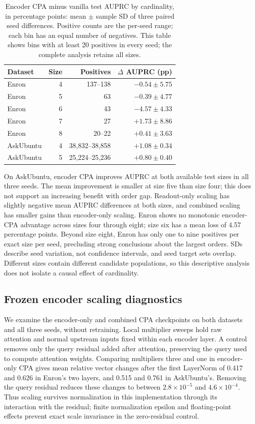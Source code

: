 \documentclass{article}
\begin{document}
\begin{table}[t]
\centering
\small
\caption{Encoder CPA minus vanilla test AUPRC by cardinality, in percentage points: mean $\pm$ sample SD of three paired seed differences. Positive counts are the per-seed range; each bin has an equal number of negatives. This table shows bins with at least 20 positives in every seed; the complete analysis retains all sizes.}
\label{tab:cardinality}
\begin{tabular}{lrrr}
\toprule
Dataset & Size & Positives & $\Delta$ AUPRC (pp) \\
\midrule
Enron & 4 & 137--138 & $-0.54\pm5.75$ \\
Enron & 5 & 63 & $-0.39\pm4.77$ \\
Enron & 6 & 43 & $-4.57\pm4.33$ \\
Enron & 7 & 27 & $+1.73\pm8.86$ \\
Enron & 8 & 20--22 & $+0.41\pm3.63$ \\
AskUbuntu & 4 & 38,832--38,858 & $+1.08\pm0.34$ \\
AskUbuntu & 5 & 25,224--25,236 & $+0.80\pm0.40$ \\
\bottomrule
\end{tabular}
\end{table}

On AskUbuntu, encoder CPA improves AUPRC at both available test sizes in all three seeds. The mean improvement is smaller at size five than size four; this does not support an increasing benefit with order gap. Readout-only scaling has slightly negative mean AUPRC differences at both sizes, and combined scaling has smaller gains than encoder-only scaling. Enron shows no monotonic encoder-CPA advantage across sizes four through eight; size six has a mean loss of 4.57 percentage points. Beyond size eight, Enron has only one to nine positives per exact size per seed, precluding strong conclusions about the largest orders. SDs describe seed variation, not confidence intervals, and seed target sets overlap. Different sizes contain different candidate populations, so this descriptive analysis does not isolate a causal effect of cardinality.

\subsection{Frozen encoder scaling diagnostics}
We examine the encoder-only and combined CPA checkpoints on both datasets and all three seeds, without retraining. Local multiplier sweeps hold raw attention and normal upstream inputs fixed within each encoder layer. A control removes only the query residual added after attention, preserving the query used to compute attention weights. Comparing multipliers three and one in encoder-only CPA gives mean relative vector changes after the first LayerNorm of 0.417 and 0.626 in Enron's two layers, and 0.515 and 0.761 in AskUbuntu's. Removing the query residual reduces these changes to between $2.8\times10^{-5}$ and $4.6\times10^{-4}$. Thus scaling survives normalization in this implementation through its interaction with the residual; finite normalization epsilon and floating-point effects prevent exact scale invariance in the zero-residual control.
\end{document}
